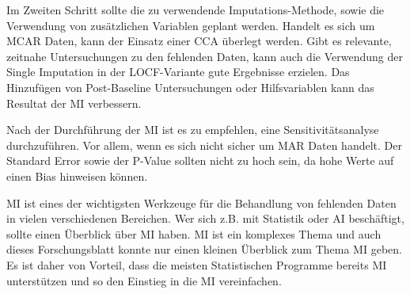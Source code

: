 Im Zweiten Schritt sollte die zu verwendende Imputations-Methode, sowie die Verwendung von zusätzlichen Variablen geplant 
werden. 
Handelt es sich um MCAR Daten, kann der Einsatz einer CCA überlegt werden. Gibt es relevante, zeitnahe Untersuchungen 
zu den fehlenden Daten, kann auch die Verwendung der Single Imputation in der LOCF-Variante gute Ergebnisse erzielen. 
Das Hinzufügen von Post-Baseline Untersuchungen oder Hilfsvariablen kann das Resultat der MI verbessern. 

Nach der Durchführung der MI ist es zu empfehlen, eine Sensitivitätsanalyse durchzuführen. Vor allem, wenn es sich nicht 
sicher um MAR Daten handelt. Der Standard Error sowie der P-Value sollten nicht zu hoch sein, da hohe Werte auf einen Bias hinweisen können.

MI ist eines der wichtigsten Werkzeuge für die Behandlung von fehlenden Daten in vielen verschiedenen Bereichen. 
Wer sich z.B. mit Statistik oder AI beschäftigt, sollte einen Überblick über MI haben. MI ist ein komplexes Thema und 
auch dieses Forschungsblatt konnte nur einen kleinen Überblick zum Thema MI geben. Es ist daher von Vorteil, dass die 
meisten Statistischen Programme bereits MI unterstützen und so den Einstieg in die MI vereinfachen. 



